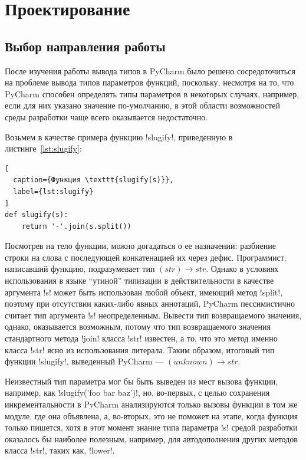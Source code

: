 \chapter{Проектирование}
\label{sec:designing}

\section{Выбор направления работы}
\label{sec:work-direction}

После изучения работы вывода типов в PyCharm было решено сосредоточиться на
проблеме вывода типов параметров функций, поскольку, несмотря на то, что PyCharm
способен определять типы параметров в некоторых случаях, например, если для них
указано значение по-умолчанию, в этой области возможностей среды разработки чаще
всего оказывается недостаточно.

Возьмем в качестве примера функцию !slugify!, приведенную в
листинге~\ref{lst:slugify}:

\begin{lstlisting}[
  caption={Функция \texttt{slugify(s)}},
  label={lst:slugify}
]
def slugify(s):
    return '-'.join(s.split())
\end{lstlisting}

Посмотрев на тело функции, можно догадаться о ее назначении: разбиение строки на
слова с последующей конкатенацией их через дефис. Программист, написавший
функцию, подразумевает тип $(str) \rightarrow str$. Однако в условиях
использования в языке ``утиной'' типизации в действительности в качестве
аргумента !s! может быть использован любой объект, имеющий метод !split!,
поэтому при отсутствии каких-либо явных аннотаций, PyCharm пессимистично считает
тип аргумента !s!  неопределенным.  Вывести тип возвращаемого значения, однако,
оказывается возможным, потому что тип возвращаемого значения стандартного метода
!join! класса !str! известен, а то, что это метод именно класса !str! ясно из
использования литерала.  Таким образом, итоговый тип функции !slugify!,
выведенный PyCharm --- $(unknown) \rightarrow str$.

Неизвестный тип параметра мог бы быть выведен из мест вызова функции, например, 
как !slugify('foo bar baz')!, но, во-первых, с целью сохранения
инкрементальности в PyCharm анализируются только вызовы функции в том же модуле,
где она объявлена, а, во-вторых, это не поможет на этапе, когда функция только
пишется, хотя в этот момент знание типа параметра !s! средой разработки
оказалось бы наиболее полезным, например, для автодополнения других методов
класса !str!, таких как, !lower!.

